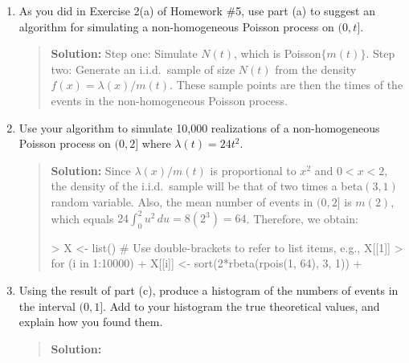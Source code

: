 \documentclass{article}
\begin{document}
\begin{enumerate}
\begin{enumerate}
  \item As you did in Exercise 2(a) of Homework \#5, use part (a) to suggest an
  algorithm for simulating a non-homogeneous Poisson process on $(0, t]$.
  \begin{quotation}{\bf Solution:}
  Step one:  Simulate $N(t)$, which is Poisson$\{m(t)\}$.  Step two:  Generate an 
  i.i.d.~sample of size $N(t)$ from the density $f(x)=\lambda(x)/m(t)$.  These sample points
  are then the times of the events in the non-homogeneous Poisson process.
  \end{quotation}

  \item Use your algorithm to simulate 10,000 realizations of a non-homogeneous
  Poisson process on $(0, 2]$ where $\lambda(t) = 24t^2$.
  \begin{quotation}{\bf Solution:}
  Since $\lambda(x)/m(t)$ is proportional to $x^2$ and $0<x<2$, the density of the
  i.i.d.~sample will be that of two times a beta$(3,1)$ random variable.  Also, the mean 
  number of events in $(0,2]$ is $m(2)$, which equals 
  $24 \int_0^2 u^2\,du = 8(2^3) = 64$.  Therefore, we obtain:
\begin{Schunk}
\begin{Sinput}
> X <- list()  # Use double-brackets to refer to list items, e.g., X[[1]]
> for (i in 1:10000) {
+   X[[i]] <- sort(2*rbeta(rpois(1, 64), 3, 1))
+ }
\end{Sinput}
\end{Schunk}
  \end{quotation}

  \item Using the result of part (c), produce a histogram of the numbers of
  events in the interval $(0, 1]$. Add to your histogram the true theoretical
  values, and explain how you found them.
  \begin{quotation}{\bf Solution:}
  

\end{quotation}
\end{enumerate}
\end{enumerate}
\end{document}
